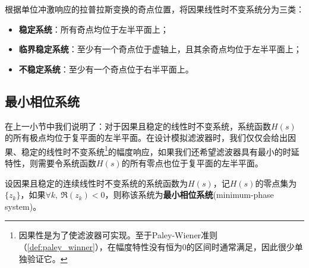 \begin{definition}
    根据单位冲激响应的拉普拉斯变换的奇点位置，将因果线性时不变系统分为三类：
    \begin{itemize}
        \item \textbf{稳定系统}：所有奇点均位于左半平面上；
        \item \textbf{临界稳定系统}：至少有一个奇点位于虚轴上，且其余奇点均位于左半平面上；
        \item \textbf{不稳定系统}：至少有一个奇点位于右半平面上。
    \end{itemize}
\end{definition}

\subsection{最小相位系统}\label{sub:min_phase}

在上一小节中我们说明了：对于因果且稳定的线性时不变系统，系统函数$H(s)$的所有极点均位于复平面的左半平面。在设计模拟滤波器时，我们仅仅会给出因果、稳定的线性时不变系统\footnote{因果性是为了使滤波器可实现。至于Paley-Wiener准则（\cref{def:paley_winner}），在幅度特性没有恒为$0$的区间时通常满足，因此很少单独验证它。}的幅度响应，如果我们还希望滤波器具有最小的时延特性，则需要令系统函数$H(s)$的所有零点也位于复平面的左半平面。

\begin{definition}[最小相位系统]
    设因果且稳定的连续线性时不变系统的系统函数为$H(s)$，记$H(s)$的零点集为$\{z_k\}$，如果$\forall k,\ \Re(z_k)<0$，则称该系统为\textbf{最小相位系统}(minimum-phase system)。
\end{definition}

